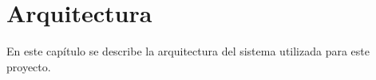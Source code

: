 \chapter{Arquitectura}
\noindent
En este capítulo se describe la arquitectura del sistema utilizada para este proyecto.


